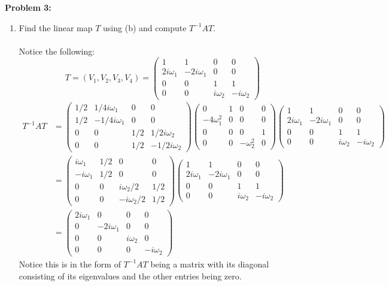 \documentclass[11pt]{article}
\newenvironment{problem}[1]{\textbf{Problem #1: }}{\newpage}
\begin{document}
\begin{problem}{3}
\begin{enumerate}[label = (\alph*)]
			\newpage
			\item Find the linear map $T$ using (b) and compute $T^{-1}AT$.
			\\ \\
			Notice the following:
			\[T = (V_1, V_2, V_3, V_4) = \begin{pmatrix}
					1 & 1 & 0 & 0 \\
					2i\omega_1 & -2i\omega_1 & 0 & 0 \\
					0 & 0 & 1 & 1 \\
					0 & 0 & i\omega_2 & -i\omega_2
				\end{pmatrix} \]
			\begin{align*}
				T^{-1}AT &= \begin{pmatrix}
					1/2 & 1/4i\omega_1 & 0 & 0 \\
					1/2 & -1/4i\omega_1 & 0 & 0 \\
					0 & 0 & 1/2 & 1/2i\omega_2 \\
					0 & 0 & 1/2 & -1/2i\omega_2
				\end{pmatrix}\begin{pmatrix}
					0 & 1 & 0 & 0 \\
					-4\omega_1^2 & 0 & 0 & 0 \\
					0 & 0 & 0 & 1 \\
					0 & 0 & -\omega_2^2 & 0	
				\end{pmatrix}\begin{pmatrix}
					1 & 1 & 0 & 0 \\
					2i\omega_1 & -2i\omega_1 & 0 & 0 \\
					0 & 0 & 1 & 1 \\
					0 & 0 & i\omega_2 & -i\omega_2
				\end{pmatrix} \\
				&= \begin{pmatrix}
					i\omega_1 & 1/2 & 0 & 0 \\
					-i\omega_1 & 1/2 & 0 & 0 \\
					0 & 0 & i\omega_2 / 2 & 1/2 \\
					0 & 0 & -i\omega_2 / 2 & 1/2 
				\end{pmatrix}\begin{pmatrix}
					1 & 1 & 0 & 0 \\
					2i\omega_1 & -2i\omega_1 & 0 & 0 \\
					0 & 0 & 1 & 1 \\
					0 & 0 & i\omega_2 & -i\omega_2
				\end{pmatrix} \\
				&= \begin{pmatrix}
					2i\omega_1 & 0 & 0 & 0 \\
					0 & -2i\omega_1 & 0 & 0 \\
					0 & 0 & i\omega_2 & 0 \\
					0 & 0 & 0 & -i\omega_2
				\end{pmatrix}
			\end{align*}
			Notice this is in the form of $T^{-1}AT$ being a matrix with its diagonal consisting of its eigenvalues and the other entries being zero.
		\end{enumerate}
	\end{problem}
\end{document}
